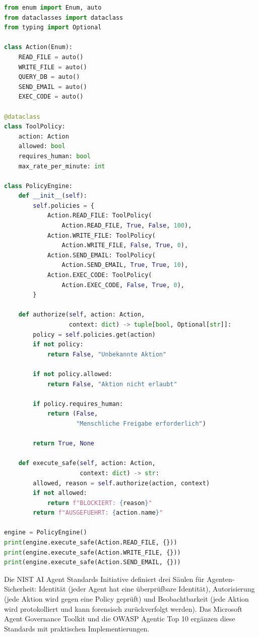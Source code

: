 \begin{lstlisting}[language=Python, caption=Agent-Security: Policy-basierte Tool-Kontrolle mit separater Policy-Engine]
from enum import Enum, auto
from dataclasses import dataclass
from typing import Optional

class Action(Enum):
    READ_FILE = auto()
    WRITE_FILE = auto()
    QUERY_DB = auto()
    SEND_EMAIL = auto()
    EXEC_CODE = auto()

@dataclass
class ToolPolicy:
    action: Action
    allowed: bool
    requires_human: bool
    max_rate_per_minute: int

class PolicyEngine:
    def __init__(self):
        self.policies = {
            Action.READ_FILE: ToolPolicy(
                Action.READ_FILE, True, False, 100),
            Action.WRITE_FILE: ToolPolicy(
                Action.WRITE_FILE, False, True, 0),
            Action.SEND_EMAIL: ToolPolicy(
                Action.SEND_EMAIL, True, True, 10),
            Action.EXEC_CODE: ToolPolicy(
                Action.EXEC_CODE, False, True, 0),
        }

    def authorize(self, action: Action,
                  context: dict) -> tuple[bool, Optional[str]]:
        policy = self.policies.get(action)
        if not policy:
            return False, "Unbekannte Aktion"

        if not policy.allowed:
            return False, "Aktion nicht erlaubt"

        if policy.requires_human:
            return (False,
                    "Menschliche Freigabe erforderlich")

        return True, None

    def execute_safe(self, action: Action,
                     context: dict) -> str:
        allowed, reason = self.authorize(action, context)
        if not allowed:
            return f"BLOCKIERT: {reason}"
        return f"AUSGEFUEHRT: {action.name}"

engine = PolicyEngine()
print(engine.execute_safe(Action.READ_FILE, {}))
print(engine.execute_safe(Action.WRITE_FILE, {}))
print(engine.execute_safe(Action.SEND_EMAIL, {}))
\end{lstlisting}

Die NIST AI Agent Standards Initiative definiert drei Säulen für Agenten-Sicherheit: Identität (jeder Agent hat eine überprüfbare Identität), Autorisierung (jede Aktion wird gegen eine Policy geprüft) und Beobachtbarkeit (jede Aktion wird protokolliert und kann forensisch zurückverfolgt werden). Das Microsoft Agent Governance Toolkit und die OWASP Agentic Top 10 ergänzen diese Standards mit praktischen Implementierungen.

